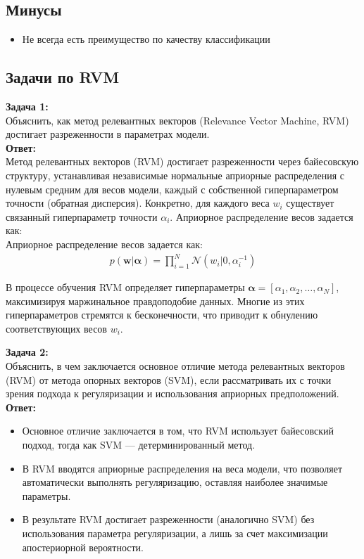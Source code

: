\subsection*{Минусы}
\begin{itemize}
    \item Не всегда есть преимущество по качеству классификации
\end{itemize}

\subsection{Задачи по RVM}
\textbf{Задача 1:}\\
Объяснить, как метод релевантных векторов (Relevance Vector Machine, RVM) достигает разреженности в параметрах модели.  \\
\textbf{Ответ:}\\
Метод релевантных векторов (RVM) достигает разреженности через байесовскую структуру, устанавливая независимые нормальные априорные распределения с нулевым средним для весов модели, каждый с собственной гиперпараметром точности (обратная дисперсия). Конкретно, для каждого веса $w_i$ существует связанный гиперпараметр точности $\alpha_i$. 
Априорное распределение весов задается как:\\
Априорное распределение весов задается как:
\begin{align*}
       p(\mathbf{w} | \boldsymbol{\alpha}) = \prod_{i=1}^N \mathcal{N}(w_i | 0, \alpha_i^{-1})
\end{align*}

В процессе обучения RVM определяет гиперпараметры  $\boldsymbol{\alpha} = [\alpha_1, \alpha_2, \dots, \alpha_N]$, максимизируя маржинальное правдоподобие данных. Многие из этих гиперпараметров стремятся к бесконечности, что приводит к обнулению соответствующих весов $ w_i$. 

\textbf{Задача 2:}\\
Объяснить, в чем заключается основное отличие метода релевантных векторов (RVM) от метода опорных векторов (SVM), если рассматривать их с точки зрения подхода к регуляризации и использования априорных предположений. \\
\textbf{Ответ:}
\begin{itemize}
    \item Основное отличие заключается в том, что RVM использует байесовский подход, тогда как SVM — детерминированный метод. 
    \item В RVM вводятся априорные распределения на веса модели, что позволяет автоматически выполнять регуляризацию, оставляя наиболее значимые параметры.
    \item В результате RVM достигает разреженности (аналогично SVM) без использования параметра регуляризации, а лишь за счет максимизации апостериорной вероятности.

\end{itemize}


